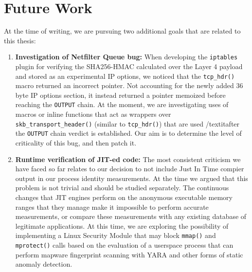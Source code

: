 \section{Future Work}
\label{conclusion:future}

At the time of writing, we are pursuing two additional goals that are related
to this thesis:

\begin{enumerate}
    \item \textbf{Investigation of Netfilter Queue bug:} When developing the
    \texttt{iptables} plugin for verifying the SHA256-HMAC calculated over
    the Layer 4 payload and stored as an experimental IP options, we noticed
    that the \texttt{tcp\_hdr()} macro returned an incorrect pointer. Not
    accounting for the newly added 36 byte IP options section, it instead
    returned a pointer memoized before reaching the \texttt{OUTPUT} chain. At
    the moment, we are investigating uses of macros or inline functions that
    act as wrappers over \texttt{skb\_transport\_header()} (similar to
    \texttt{tcp\_hdr()}) that are used /textit{after} the \texttt{OUTPUT} chain
    verdict is established. Our aim is to determine the level of criticality of
    this bug, and then patch it.

    \item \textbf{Runtime verification of JIT-ed code:} The most consistent
    criticism we have faced so far relates to our decision to not include
    Just In Time compier output in our process identity measurements. At the time
    we argued that this problem is not trivial and should be studied separately.
    The continuous changes that JIT engines perform on the anonymous executable
    memory ranges that they manage make it impossible to perform accurate
    measurements, or compare these measurements with any existing database of
    legitimate applications. At this time, we are exploring the possibility of
    implementing a Linux Security Module that may block \texttt{mmap()} and
    \texttt{mprotect()} calls based on the evaluation of a userspace process
    that can perform mapware fingerprint scanning with YARA \cite{naik2020embedding}
    and other forms of static anomaly detection.
\end{enumerate}
